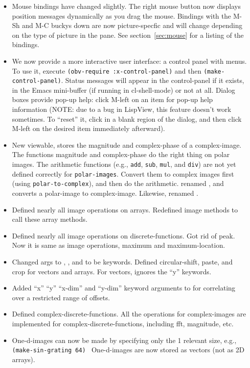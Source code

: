 \begin{itemize}
\item Mouse bindings have changed slightly.  The right mouse button
now displays position messages dynamically as you drag the mouse.
Bindings with the M-Sh and M-C buckys down are now picture-specfic and
will change depending on the type of picture in the pane.  See
section~\ref{sec:mouse} for a listing of the bindings.

\item We now provide a more interactive user interface: a control
panel with menus.  To use it, execute {\tt (obv-require
:x-control-panel)} and then {\tt (make-control-panel)}.  Status
messages will appear in the control-panel if it exists, in the Emacs
mini-buffer (if running in cl-shell-mode) or not at all.  Dialog boxes
provide pop-up help: click M-left on an item for pop-up help
information (NOTE: due to a bug in LispView, this feature doesn't work
sometimes.  To ``reset'' it, click in a blank region of the dialog,
and then click M-left on the desired item immediately afterward).

\item New viewable,  stores the magnitude and
complex-phase of a complex-image.  The functions magnitude and
complex-phase do the right thing on polar images.  The arithmetic
functions (e.g., {\tt add}, {\tt sub}, {\tt mul}, and {\tt div}) are
not yet defined correctly for {\tt polar-images}.  Convert them to
complex images first (using {\tt polar-to-complex}), and then do the
arithmetic.   renamed , and converts a
polar-image to complex-image.  Likewise,  renamed
.

\item Defined nearly all image operations on arrays.  Redefined image
methods to call these array methods.

\item Defined nearly all image operations on discrete-functions.
Got rid of peak.  Now it is same as image operations, maximum and
maximum-location.

\item Changed args to , , and
 to be keywords.
Defined circular-shift, paste, and crop for vectors and arrays.  For
vectors, ignores the ``y'' keywords.

\item Added ``x'' ``y'' ``x-dim'' and ``y-dim'' keyword arguments to 
 for correlating over a restricted range of offsets.

\item Defined complex-discrete-functions.  All the operations for
complex-images are implemented for complex-discrete-functions,
including fft, magnitude, etc.

\item One-d-images can now be made by specifying only the 1 relevant
size, e.g., {\tt (make-sin-grating 64) } 
One-d-images are now stored as vectors (not as 2D arrays).

\end{itemize}

